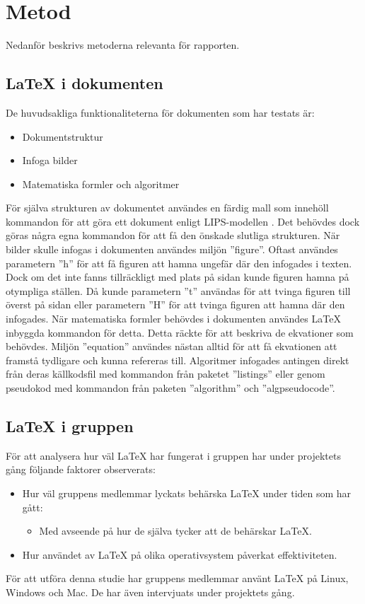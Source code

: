 \section{Metod}  
Nedanför beskrivs metoderna relevanta för rapporten.  

\subsection{{\LaTeX} i dokumenten}
De huvudsakliga funktionaliteterna för dokumenten som har testats är: 
\begin{itemize}
\item Dokumentstruktur
\item Infoga bilder
\item Matematiska formler och algoritmer
\end{itemize}   
För själva strukturen av dokumentet användes en färdig mall som innehöll kommandon för att göra ett dokument enligt LIPS-modellen \citep{lips}. Det behövdes dock göras några egna kommandon för att få den önskade slutliga strukturen.
\newline
\newline
När bilder skulle infogas i dokumenten användes miljön ''figure''. Oftast användes parametern ''h'' för att få figuren att hamna ungefär där den infogades i texten. Dock om det inte fanns tillräckligt med plats på sidan kunde figuren hamna på otympliga ställen. Då kunde parametern ''t'' användas för att tvinga figuren till överst på sidan eller parametern ''H'' för att tvinga figuren att hamna där den infogades.   
\newline
\newline
När matematiska formler behövdes i dokumenten användes {\LaTeX} inbyggda kommandon för detta. Detta räckte för att beskriva de ekvationer som behövdes. Miljön ''equation'' användes nästan alltid för att få ekvationen att framstå tydligare och kunna refereras till. Algoritmer infogades antingen direkt från deras källkodsfil med kommandon från paketet ''listings'' eller genom pseudokod med kommandon från paketen ''algorithm'' och ''algpseudocode''.  
     
\subsection{{\LaTeX} i gruppen}
För att analysera hur väl {\LaTeX} har fungerat i gruppen har under projektets gång följande faktorer observerats:   
\begin{itemize}
	\item Hur väl gruppens medlemmar lyckats behärska {\LaTeX} under tiden som har gått:
	\begin{itemize}
		\item Med avseende på hur de själva tycker att de behärskar {\LaTeX}. 
	\end{itemize}
	\item Hur användet av {\LaTeX} på olika operativsystem påverkat effektiviteten.
\end{itemize} 
För att utföra denna studie har gruppens medlemmar använt {\LaTeX} på Linux, Windows och Mac. De har även intervjuats under projektets gång.   
